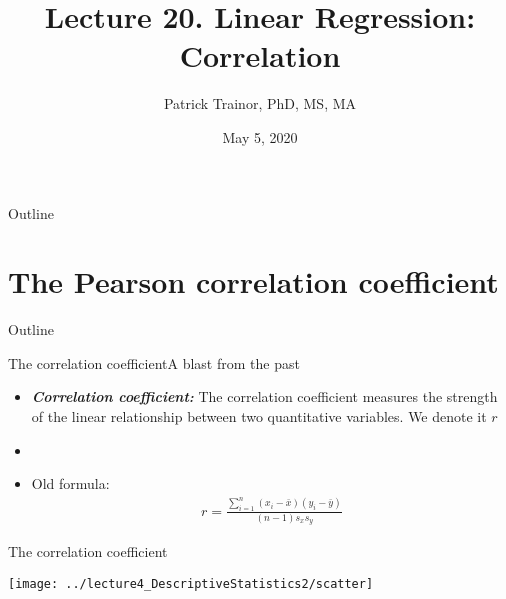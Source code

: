 \documentclass[xcolor=dvipsnames]{beamer}
\title[Lecture 20]{Lecture 20. Linear Regression: Correlation}
\author[Patrick Trainor]{Patrick Trainor, PhD, MS, MA}
\institute[NMSU]{New Mexico State University}
\date{May 5, 2020}
\begin{document}
\begin{frame}
\maketitle
\end{frame}

\begin{frame}{Outline}
\tableofcontents[hideallsubsections]
\end{frame}

\section{The Pearson correlation coefficient}
\begin{frame}{Outline}
	\tableofcontents[currentsection,subsectionstyle=show/shaded/hide]
\end{frame}

\begin{frame}{The correlation coefficient}{A blast from the past}
	\begin{itemize}
		\item \textbf{\emph{Correlation coefficient:}} The correlation coefficient measures the strength of the linear relationship between two quantitative variables. We denote it $r$ \pause
		\item[]
		\item Old formula: \pause
		\begin{gather*}
		r = \frac{\sum_{i=1}^n(x_i -\bar{x})(y_i - \bar{y})}{(n-1) s_x s_y}
		\end{gather*}
	\end{itemize}
\end{frame}

\begin{frame}{The correlation coefficient}
	\begin{center}
		\texttt{[image: ../lecture4\_DescriptiveStatistics2/scatter]}
	\end{center}
\end{frame}
\end{document}
